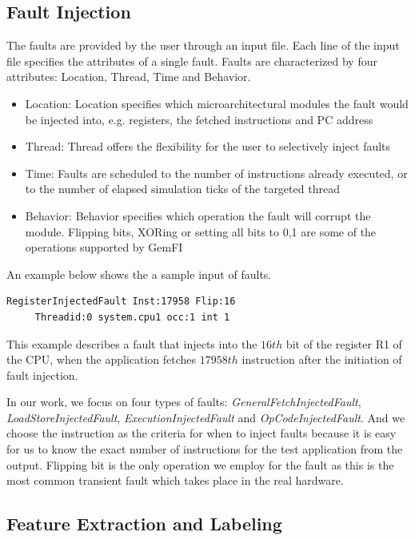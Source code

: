 \subsection{Fault Injection}\label{section:FI}
The faults are provided by the user through an input file. Each line of the input file specifies the attributes of a single fault. Faults are characterized by four attributes: Location, Thread, Time and Behavior. 
\begin{itemize}
\item Location: Location specifies which microarchitectural modules the fault would be injected into, e.g. registers, the fetched instructions and PC address
\item Thread: Thread offers the flexibility for the user to selectively inject faults
\item Time: Faults are scheduled to the number of instructions already executed, or to the number of elapsed simulation ticks of the targeted thread
\item Behavior: Behavior specifies which operation the fault will corrupt the module. Flipping bits, XORing or setting all bits to 0,1 are some of the operations supported by GemFI
\end{itemize}

An example below shows the a sample input of faults. 
\begin{lstlisting}	
RegisterInjectedFault Inst:17958 Flip:16 
     Threadid:0 system.cpu1 occ:1 int 1
\end{lstlisting}

This example describes a fault that injects into the $16th$ bit of the register R1 of the CPU, when the application fetches $17958th$ instruction after the initiation of fault injection. 

In our work, we focus on four types of faults: \textit{GeneralFetchInjectedFault}, \textit{LoadStoreInjectedFault}, \textit{ExecutionInjectedFault} and \textit{OpCodeInjectedFault}. And we choose the instruction as the criteria for when to inject faults because it is easy for us to know the exact number of instructions for the test application from the output. Flipping bit is the only operation we employ for the fault as this is the most common transient fault which takes place in the real hardware. 



\subsection{Feature Extraction and Labeling}\label{section:FE}
